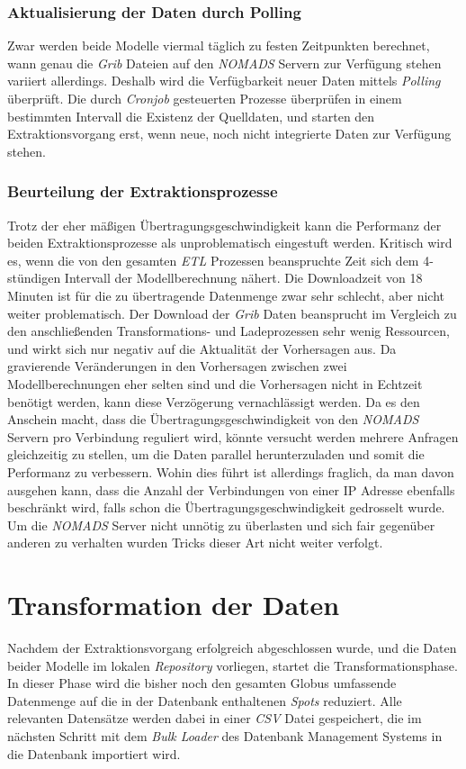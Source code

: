 \subsubsection{Aktualisierung der Daten durch Polling}
Zwar werden beide Modelle viermal täglich zu festen Zeitpunkten
berechnet, wann genau die \textit{Grib} Dateien auf den
\textit{NOMADS} Servern zur Verfügung stehen variiert
allerdings. Deshalb wird die Verfügbarkeit neuer Daten mittels
\textit{Polling} überprüft. Die durch \textit{Cronjob} gesteuerten
Prozesse überprüfen in einem bestimmten Intervall die Existenz der
Quelldaten, und starten den Extraktionsvorgang erst, wenn neue, noch
nicht integrierte Daten zur Verfügung stehen.

\subsubsection{Beurteilung der Extraktionsprozesse}
Trotz der eher mäßigen Übertragungsgeschwindigkeit kann die Performanz
der beiden Extraktionsprozesse als unproblematisch eingestuft
werden. Kritisch wird es, wenn die von den gesamten \textit{ETL}
Prozessen beanspruchte Zeit sich dem 4-stündigen Intervall der
Modellberechnung nähert. Die Downloadzeit von 18 Minuten ist für die
zu übertragende Datenmenge zwar sehr schlecht, aber nicht weiter
problematisch. Der Download der \textit{Grib} Daten beansprucht im
Vergleich zu den anschließenden Transformations- und Ladeprozessen
sehr wenig Ressourcen, und wirkt sich nur negativ auf die Aktualität
der Vorhersagen aus. Da gravierende Veränderungen in den Vorhersagen
zwischen zwei Modellberechnungen eher selten sind und die Vorhersagen
nicht in Echtzeit benötigt werden, kann diese Verzögerung
vernachlässigt werden. Da es den Anschein macht, dass die
Übertragungsgeschwindigkeit von den \textit{NOMADS} Servern pro
Verbindung reguliert wird, könnte versucht werden mehrere Anfragen
gleichzeitig zu stellen, um die Daten parallel herunterzuladen und
somit die Performanz zu verbessern. Wohin dies führt ist allerdings
fraglich, da man davon ausgehen kann, dass die Anzahl der Verbindungen
von einer IP Adresse ebenfalls beschränkt wird, falls schon die
Übertragungsgeschwindigkeit gedrosselt wurde. Um die \textit{NOMADS}
Server nicht unnötig zu überlasten und sich fair gegenüber anderen zu
verhalten wurden Tricks dieser Art nicht weiter verfolgt.

\section{Transformation der Daten}
Nachdem der Extraktionsvorgang erfolgreich abgeschlossen wurde, und
die Daten beider Modelle im lokalen \textit{Repository} vorliegen,
startet die Transformationsphase. In dieser Phase wird die bisher noch
den gesamten Globus umfassende Datenmenge auf die in der Datenbank
enthaltenen \textit{Spots} reduziert. Alle relevanten Datensätze
werden dabei in einer \textit{CSV}  Datei gespeichert, die im nächsten Schritt mit dem
\textit{Bulk Loader} des Datenbank Management Systems in die Datenbank
importiert wird.


